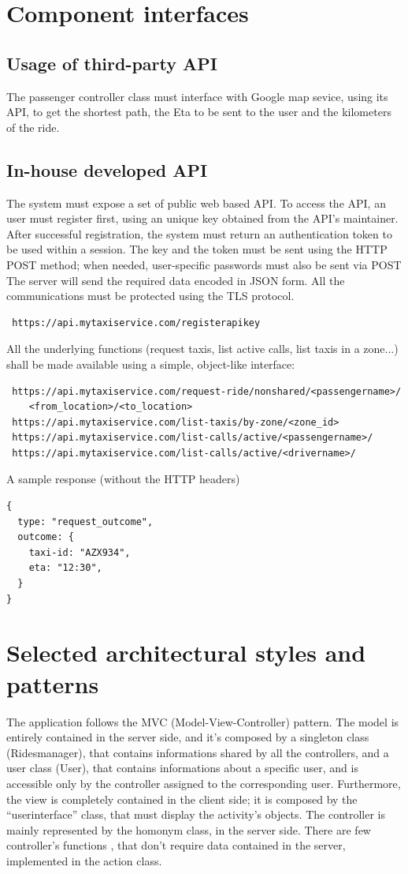 \section{Component interfaces}

\subsection{Usage of third-party API}
The passenger controller class must interface with Google map sevice, using its API, to get the shortest path, the Eta to be sent to the user and the 
kilometers of the ride.

\subsection{In-house developed API}
The system must expose a set of public web based API. To access the API, an user must register first, using an unique key
obtained from the API's maintainer.
After successful registration, the system must return an authentication token to be used within a session.
The key and the token must be sent using the HTTP POST method; when needed, user-specific passwords must also
be sent via POST
The server will send the required data encoded in JSON form.
All the communications must be protected using the TLS protocol.
\begin{verbatim}
 https://api.mytaxiservice.com/registerapikey
\end{verbatim}
All the underlying functions (request taxis, list active calls, list taxis in a zone...) shall be made available using a simple,
object-like interface:
\begin{verbatim}
 https://api.mytaxiservice.com/request-ride/nonshared/<passengername>/
    <from_location>/<to_location>
 https://api.mytaxiservice.com/list-taxis/by-zone/<zone_id>
 https://api.mytaxiservice.com/list-calls/active/<passengername>/
 https://api.mytaxiservice.com/list-calls/active/<drivername>/
\end{verbatim}
A sample response (without the HTTP headers)
\begin{verbatim}
{
  type: "request_outcome",
  outcome: {
    taxi-id: "AZX934",
    eta: "12:30",
  }
}
\end{verbatim}

\section{Selected architectural styles and patterns}
The application follows the MVC (Model-View-Controller) pattern.
The model is entirely contained in the server side, and it's composed by a singleton class (Ridesmanager), that contains 
informations shared by all the controllers, and a user class (User), that contains informations about a specific user, and is
accessible only by the controller assigned to the corresponding user.
Furthermore, the view is completely contained in the client side; it is composed by the ``userinterface'' class, that must display
the activity's objects.
The controller is mainly represented by the homonym class, in the server side. There are few controller's functions , that don't 
require data contained in the server, implemented in the action class.

